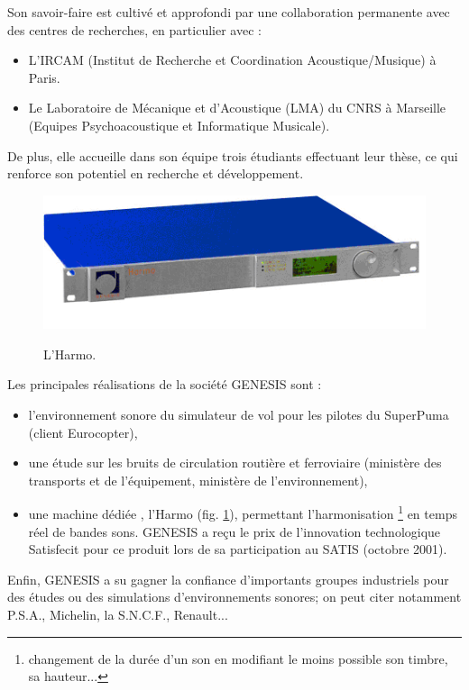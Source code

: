 Son savoir-faire est cultiv{\'e} et approfondi par une collaboration
permanente avec des centres de recherches, en particulier avec :\\

\begin{itemize}
    \item L'IRCAM (Institut de Recherche et Coordination Acoustique/Musique)
          {\`a} Paris.\\
    \item Le Laboratoire de M{\'e}canique et d'Acoustique (LMA) du CNRS {\`a} Marseille
          (Equipes Psychoacoustique et Informatique Musicale).\\
\end{itemize}

De plus, elle accueille dans son {\'e}quipe trois {\'e}tudiants effectuant
leur th{\`e}se, ce qui renforce son potentiel en recherche et d{\'e}veloppement.\\

\begin{figure}[h]
    \centering
    \includegraphics[width=12cm]{figures/harmo.png}\\
    \caption{L'Harmo.}
    \label{harmo}
\end{figure}

Les principales r{\'e}alisations de la soci{\'e}t{\'e} GENESIS sont :\\

\begin{itemize}
    \item l'environnement sonore du simulateur de vol pour les pilotes du
    SuperPuma (client Eurocopter),\\
    \item une {\'e}tude sur les bruits de circulation routi{\`e}re et
    ferroviaire (minist{\`e}re des transports et de l'{\'e}quipement,
    minist{\`e}re de l'environnement),\\
    \item une machine d{\'e}di{\'e}e , l'Harmo (fig. \ref{harmo}),
    permettant l'harmonisation \footnote{changement de
    la dur{\'e}e d'un son en modifiant le moins possible son timbre,
    sa hauteur...} en temps r{\'e}el de bandes sons. GENESIS a re\c{c}u
    le prix de l'innovation technologique Satisfecit pour ce
    produit lors de sa participation au SATIS (octobre 2001).\\
\end{itemize}

Enfin, GENESIS a su gagner la confiance d'importants groupes
industriels pour des {\'e}tudes ou des simulations d'environnements
sonores; on peut citer notamment P.S.A., Michelin, la S.N.C.F.,
Renault...

